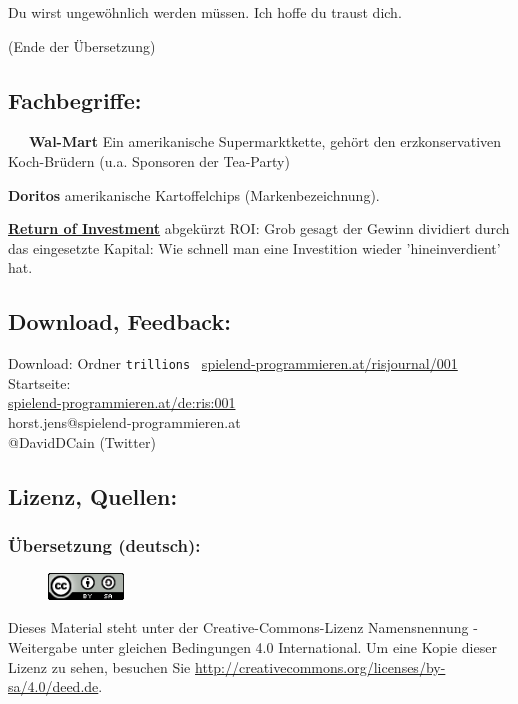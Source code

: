 \documentclass[10pt,a4paper,ngerman,twoside]{article} %
\begin{document}
\begin{multicols}{3}
Du wirst ungewöhnlich werden müssen. Ich hoffe du traust dich.


(Ende der Übersetzung)

\subsection*{Fachbegriffe:}

~~~\textbf{Wal-Mart} Ein amerikanische Supermarktkette, gehört den erzkonservativen Koch-Brüdern (u.a. Sponsoren der Tea-Party)

\textbf{Doritos} amerikanische Kartoffelchips (Markenbezeichnung). 

\href{https://de.wikipedia.org/wiki/Return_on_Investment}{\textbf{Return of Investment}} abgekürzt ROI: Grob gesagt der Gewinn dividiert durch das eingesetzte Kapital: Wie schnell man eine Investition wieder 'hineinverdient' hat. 

\subsection*{Download, Feedback:}
\footnotesize{
Download: Ordner \texttt{trillions} \Mundus\ \href{http://spielend-programmieren.at/risjournal/001}{spielend-programmieren.at/risjournal/001}\\
Startseite:\\
\href{http://spielend-programmieren.at/de:ris:001}{spielend-programmieren.at/de:ris:001}\\ 
\Letter\: horst.jens@spielend-programmieren.at\\
\Letter\: @DavidDCain (Twitter)\\}
\normalsize 

\subsection*{Lizenz, Quellen:}

\subsubsection*{Übersetzung (deutsch):}

\begin{figure}
\includegraphics[width=2cm]{trillions/ccbysa88x31.png}
\end{figure}
Dieses Material steht unter der Creative-Commons-Lizenz Namensnennung - Weitergabe unter gleichen Bedingungen 4.0 International. Um eine Kopie dieser Lizenz zu sehen, besuchen Sie \url{http://creativecommons.org/licenses/by-sa/4.0/deed.de}.


\end{multicols}
\end{document}
